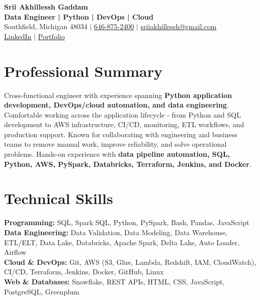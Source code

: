 \documentclass[letterpaper,10pt]{article}
\begin{document}
\fontsize{9.35pt}{10.45pt}\selectfont

\begin{center}
    {\LARGE \textbf{Srii Akhillessh Gaddam}} \\[-1pt]
    \textbf{Data Engineer | Python | DevOps | Cloud} \\[2pt]
    Southfield, Michigan 48034 $|$
    \href{tel:6468752400}{646-875-2400} $|$
    \href{mailto:sriiakhillessh@gmail.com}{sriiakhillessh@gmail.com} \\[1pt]
    \href{https://www.linkedin.com/in/srii-akhiilessh-gaddam-b48668191/}{LinkedIn} $|$
    \href{https://sriiakhillesshg.github.io/portfolio/}{Portfolio}
\end{center}
\vspace{-8pt}

\section{Professional Summary}
\small{Cross-functional engineer with experience spanning \textbf{Python application development, DevOps/cloud automation, and data engineering}. Comfortable working across the application lifecycle - from Python and SQL development to AWS infrastructure, CI/CD, monitoring, ETL workflows, and production support. Known for collaborating with engineering and business teams to remove manual work, improve reliability, and solve operational problems. Hands-on experience with \textbf{data pipeline automation, SQL, Python, AWS, PySpark, Databricks, Terraform, Jenkins, and Docker}.}

\section{Technical Skills}
\small{
\textbf{Programming:} SQL, Spark SQL, Python, PySpark, Bash, Pandas, JavaScript \\
\textbf{Data Engineering:} Data Validation, Data Modeling, Data Warehouse, ETL/ELT, Data Lake, Databricks, Apache Spark, Delta Lake, Auto Loader, Airflow \\
\textbf{Cloud \& DevOps:} Git, AWS (S3, Glue, Lambda, Redshift, IAM, CloudWatch), CI/CD, Terraform, Jenkins, Docker, GitHub, Linux \\
\textbf{Web \& Databases:} Snowflake, REST APIs, HTML, CSS, JavaScript, PostgreSQL, Greenplum
}
\end{document}
